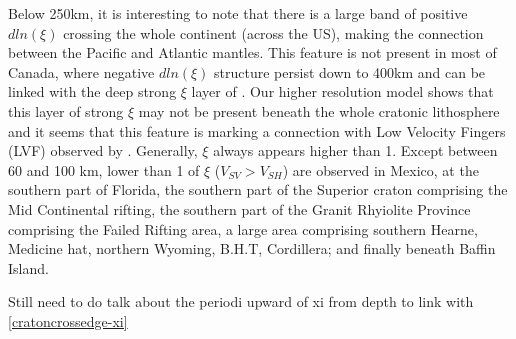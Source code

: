 \documentclass[12pt]{article}
\begin{document}
		Below 250km, it is interesting to note that there is a large band of positive $dln(\xi)$ crossing the whole continent (across the US), making the connection between the Pacific and Atlantic mantles. 
		This feature is not present in most of Canada, where negative $dln(\xi)$ structure persist down to 400km and can be linked with the deep strong $\xi$ layer of \cite{gung2003global}. Our higher resolution model shows that this layer of strong $\xi$ may not be present beneath the whole cratonic lithosphere and it seems that this feature is marking a connection with Low Velocity Fingers (LVF) observed by \cite{french2013waveform}. %
		Generally, $\xi$ always appears higher than 1. 
		Except between 60 and 100 km, lower than 1 of $\xi$ ($V_{SV} > V_{SH}$) are observed in Mexico, at the southern part of Florida, the southern part of the Superior craton comprising the Mid Continental rifting, the southern part of the Granit Rhyiolite Province comprising the Failed Rifting area, a large area comprising southern Hearne, Medicine hat, northern Wyoming, B.H.T, Cordillera; and finally beneath Baffin Island. 

		Still need to do talk about the periodi upward of xi from depth to link with \ref{cratoncrossedge-xi}
\end{document}
